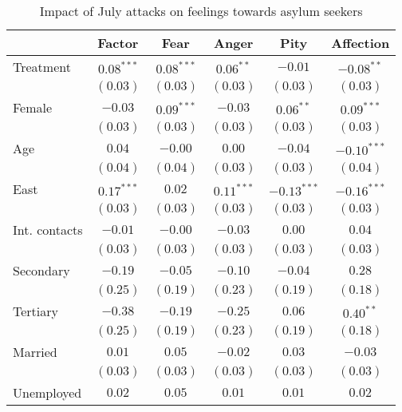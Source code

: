 
\begin{table}
\caption{Impact of July attacks on feelings towards asylum seekers}
\begin{center}
\begin{tabular}{l c c c c c}
\toprule
 & Factor & Fear & Anger & Pity & Affection \\
\midrule
Treatment     & $0.08^{***}$ & $0.08^{***}$ & $0.06^{**}$  & $-0.01$       & $-0.08^{**}$  \\
              & $(0.03)$     & $(0.03)$     & $(0.03)$     & $(0.03)$      & $(0.03)$      \\
Female        & $-0.03$      & $0.09^{***}$ & $-0.03$      & $0.06^{**}$   & $0.09^{***}$  \\
              & $(0.03)$     & $(0.03)$     & $(0.03)$     & $(0.03)$      & $(0.03)$      \\
Age           & $0.04$       & $-0.00$      & $0.00$       & $-0.04$       & $-0.10^{***}$ \\
              & $(0.04)$     & $(0.04)$     & $(0.03)$     & $(0.03)$      & $(0.04)$      \\
East          & $0.17^{***}$ & $0.02$       & $0.11^{***}$ & $-0.13^{***}$ & $-0.16^{***}$ \\
              & $(0.03)$     & $(0.03)$     & $(0.03)$     & $(0.03)$      & $(0.03)$      \\
Int. contacts & $-0.01$      & $-0.00$      & $-0.03$      & $0.00$        & $0.04$        \\
              & $(0.03)$     & $(0.03)$     & $(0.03)$     & $(0.03)$      & $(0.03)$      \\
Secondary     & $-0.19$      & $-0.05$      & $-0.10$      & $-0.04$       & $0.28$        \\
              & $(0.25)$     & $(0.19)$     & $(0.23)$     & $(0.19)$      & $(0.18)$      \\
Tertiary      & $-0.38$      & $-0.19$      & $-0.25$      & $0.06$        & $0.40^{**}$   \\
              & $(0.25)$     & $(0.19)$     & $(0.23)$     & $(0.19)$      & $(0.18)$      \\
Married       & $0.01$       & $0.05$       & $-0.02$      & $0.03$        & $-0.03$       \\
              & $(0.03)$     & $(0.03)$     & $(0.03)$     & $(0.03)$      & $(0.03)$      \\
Unemployed    & $0.02$       & $0.05$       & $0.01$       & $0.01$        & $0.02$        \\

\end{tabular}
\end{center}
\end{table}

